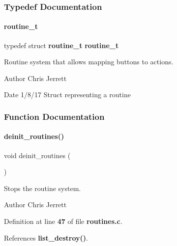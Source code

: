 \subsubsection{Typedef Documentation}
\mbox{\label{routines_8h_ac59bb3af7d2d19d489ef5f76c778bfed}} 
\paragraph{routine\+\_\+t}
{\footnotesize\ttfamily typedef struct \textbf{ routine\+\_\+t}  \textbf{ routine\+\_\+t}}



Routine system that allows mapping buttons to actions. 

\begin{DoxyAuthor}{Author}
Chris Jerrett 
\end{DoxyAuthor}
\begin{DoxyDate}{Date}
1/8/17 Struct representing a routine 
\end{DoxyDate}


\subsubsection{Function Documentation}
\mbox{\label{routines_8h_ad908adbc884189372f72f882ec62d71d}} 
\paragraph{deinit\+\_\+routines()}
{\footnotesize\ttfamily void deinit\+\_\+routines (\begin{DoxyParamCaption}{ }\end{DoxyParamCaption})}



Stops the routine system. 

\begin{DoxyAuthor}{Author}
Chris Jerrett 
\end{DoxyAuthor}


Definition at line \textbf{ 47} of file \textbf{ routines.\+c}.



References \textbf{ list\+\_\+destroy()}.


